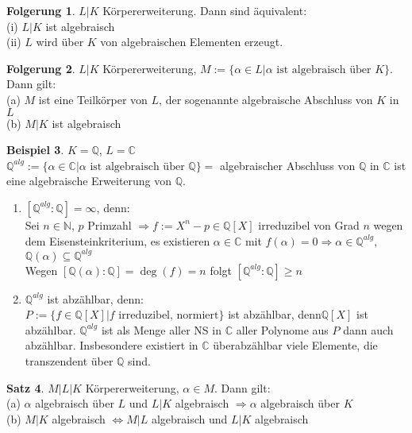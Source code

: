 \documentclass[10pt,a4paper,numbers=endperiod]{scrreprt}
\theoremstyle{definition}
\newtheorem{satz}{Satz}[section]
\newtheorem{bsp}[satz]{Beispiel}
\newtheorem{folg}[satz]{Folgerung}
\def\QQ{{\mathbb Q}}
\def\CC{{\mathbb C}}
\def\NN{{\mathbb N}}
\begin{document}
\begin{folg}
	$L|K$ Körpererweiterung. Dann sind äquivalent:\\
	(i) $L|K$ ist algebraisch\\
	(ii) $L$ wird über $K$ von algebraischen Elementen erzeugt.
\end{folg}

\begin{folg}
	$L|K$ Körpererweiterung, $M := \{\alpha \in L| \alpha \text{ ist algebraisch über $K$}\}$. Dann gilt:\\
	(a) $M$ ist eine Teilkörper von $L$, der sogenannte algebraische Abschluss von $K$ in $L$\\
	(b) $M|K$ ist algebraisch
\end{folg}

\begin{bsp}
	$K = \QQ$, $L = \CC$\\
	$\QQ^{alg} := \{\alpha \in \CC| \alpha \text{ ist algebraisch über $\QQ$}\} =$ algebraischer Abschluss von $\QQ$ in $\CC$ ist eine algebraische Erweiterung von $\QQ$.
	\begin{enumerate}
		\item $[\QQ^{alg}: \QQ] = \infty$, denn:\\
		Sei $n \in \NN$, $p$ Primzahl $\Rightarrow f := X^n-p \in \QQ[X]$ irreduzibel von Grad $n$ wegen dem Eisensteinkriterium, es existieren $\alpha \in \CC$ mit $f(\alpha) = 0 \Rightarrow \alpha \in \QQ^{alg}$, $\QQ(\alpha) \subseteq \QQ^{alg}$\\
		Wegen $[\QQ(\alpha) : \QQ] = \deg(f) = n$ folgt $[\QQ^{alg}: \QQ] \geq n$
		\item $\QQ^{alg}$ ist abzählbar, denn:\\
		$P := \{ f \in \QQ[X] | f \text{ irreduzibel, normiert}\}$ ist abzählbar, denn$\QQ[X]$ ist abzählbar. $\QQ^{alg}$ ist als Menge aller NS in $\CC$ aller Polynome aus $P$ dann auch abzählbar. Insbesondere existiert in $\CC$ überabzählbar viele Elemente, die transzendent über $\QQ$ sind.
	\end{enumerate}
\end{bsp}

\begin{satz}
	$M|L|K$ Körpererweiterung, $\alpha \in M$. Dann gilt:\\
	(a) $\alpha$ algebraisch über $L$ und $L|K$ algebraisch $\Rightarrow \alpha$ algebraisch über $K$\\
	(b) $M|K$ algebraisch $\Leftrightarrow M|L$ algebraisch und $L|K$ algebraisch
\end{satz}
\end{document}

